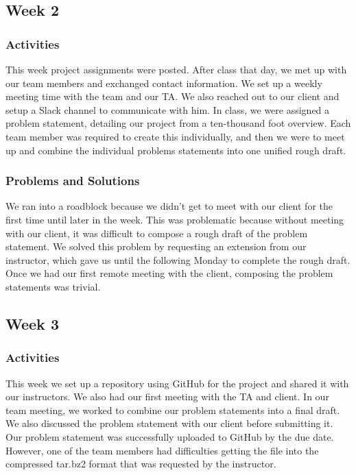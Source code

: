 \documentclass[onecolumn, draftclsnofoot,10pt, compsoc]{IEEEtran}
\begin{document}
\subsection{Week 2}

\subsubsection{Activities}
This week project assignments were posted. After class that day, we met up with our team members and exchanged contact information. We set up a weekly meeting time with the team and our TA. We also reached out to our client and setup a Slack channel to communicate with him. In class, we were assigned a problem statement, detailing our project from a ten-thousand foot overview. Each team member was required to create this individually, and then we were to meet up and combine the individual problems statements into one unified rough draft.

\subsubsection{Problems and Solutions}
We ran into a roadblock because we didn’t get to meet with our client for the first time until later in the week. This was problematic because without meeting with our client, it was difficult to compose a rough draft of the problem statement. We solved this problem by requesting an extension from our instructor, which gave us until the following Monday to complete the rough draft. Once we had our first remote meeting with the client, composing the problem statements was trivial.

\subsection{Week 3}

\subsubsection{Activities}
This week we set up a repository using GitHub for the project and shared it with our instructors. We also had our first meeting with the TA and client. In our team meeting, we worked to combine our problem statements into a final draft. We also discussed the problem statement with our client before submitting it. Our problem statement was successfully uploaded to GitHub by the due date. However, one of the team members had difficulties getting the file into the compressed tar.bz2 format that was requested by the instructor.
\end{document}
